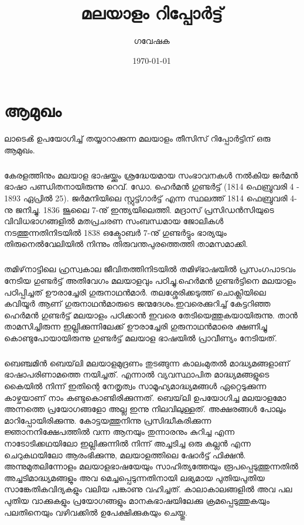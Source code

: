 \documentclass[12pt]{report}
\title{മലയാളം റിപ്പോർട്ട്}
\author{ഗവേഷക}
\date{\today}
\begin{document}



\newpage




%

\tableofcontents


\chapter{ആമുഖം}

ലാടെൿ ഉപയോഗിച്ച് തയ്യാറാക്കുന്ന മലയാളം തീസിസ് റിപ്പോർട്ടിന് ഒരു ആമുഖം.

\paragraph{}
 കേരളത്തിനും മലയാള ഭാഷയ്ക്കും ശ്രദ്ധേയമായ സംഭാവനകൾ നൽകിയ ജർമൻ ഭാഷാ പണ്ഡിതനായിരുന്നു റെവ്. ഡോ. ഹെർമൻ ഗുണ്ടർട്ട് (1814 ഫെബ്രുവരി 4 - 1893 ഏപ്രിൽ 25). ജർമനിയിലെ സ്റ്റുട്ട്ഗാർട്ട് എന്ന സ്ഥലത്ത് 1814 ഫെബ്രുവരി 4-നു ജനിച്ചു. 1836 ജൂലൈ 7-നു് ഇന്ത്യയിലെത്തി. മദ്രാസ് പ്രസിഡൻസിയുടെ വിവിധഭാഗങ്ങളിൽ മതപ്രചരണ സംബന്ധമായ ജോലികൾ നടത്തുന്നതിനിടയിൽ 1838 ഒക്ടോബർ 7-നു് ഗുണ്ടർട്ടും ഭാര്യയും തിരുനെൽവേലിയിൽ നിന്നും തിരുവന്തപുരത്തെത്തി താമസമാക്കി.

\paragraph{}
തമിഴ്‌നാട്ടിലെ ഹ്രസ്വകാല ജീവിതത്തിനിടയിൽ തമിഴ്ഭാഷയിൽ പ്രസംഗപാടവം നേടിയ ഗുണ്ടർട്ട് അതിവേഗം മലയാളവും പഠിച്ചു.ഹെർമൻ ഗുണ്ടർട്ടിനെ മലയാളം പഠിപ്പിച്ചത് ഊരാച്ചേരി ഗുരുനാഥൻമാർ. തലശ്ശേരിക്കടുത്ത് ചൊക്ലിയിലെ കവിയൂർ ആണ് ഗുരുനാഥൻമാരുടെ ജന്മദേശം.ഇവരെക്കുറിച്ച് കേട്ടറിഞ്ഞ ഹെർമൻ ഗുണ്ടർട്ട് മലയാളം പഠിക്കാൻ ഇവരെ തേടിയെത്തുകയായിരുന്നു. താൻ താമസിച്ചിരുന്ന ഇല്ലിക്കുന്നിലേക്ക് ഊരാച്ചേരി ഗുരുനാഥൻമാരെ ക്ഷണിച്ചു കൊണ്ടുപോയായിരുന്നു ഗുണ്ടർട്ട് മലയാള ഭാഷയിൽ പ്രാവീണ്യം നേടിയത്. 

\paragraph{}
ബെഞ്ചമിൻ ബെയ്‌ലി മലയാളമുദ്രണം തുടങ്ങുന്ന കാലംമുതൽ മാദ്ധ്യമങ്ങളാണ് ഭാഷാപരിണാമത്തെ നയിച്ചത്. എന്നാൽ വ്യവസ്ഥാപിത മാദ്ധ്യമങ്ങളുടെ കൈയിൽ നിന്ന് ഇതിന്റെ നേതൃത്വം സാമൂഹ്യമാദ്ധ്യമങ്ങൾ ഏറ്റെടുക്കുന്ന കാഴ്ചയാണ് നാം കണ്ടുകൊണ്ടിരിക്കുന്നത്. ബെയ്‌ലി ഉപയോഗിച്ച മലയാളമോ അന്നത്തെ പ്രയോഗങ്ങളോ അല്ല ഇന്നു നിലവിലുള്ളത്. അക്ഷരങ്ങൾ പോലും മാറിപ്പോയിരിക്കുന്നു. കോട്ടയത്തുനിന്നു പ്രസിദ്ധീകരിക്കുന്ന ജ്ഞാനനിക്ഷേപത്തിൽ വന്ന ആനയും തുന്നാരനും കുറിച്ച എന്ന നാടോടിക്കഥയിലോ ഇല്ലിക്കുന്നിൽ നിന്ന് അച്ചടിച്ച ഒരു കല്ലൻ എന്ന ചെറുകഥയിലോ ആരംഭിക്കുന്നു, മലയാളത്തിലെ ഷോർട്ട് ഫിക്ഷൻ. അന്നുമുതലിന്നോളം മലയാളഭാഷയേയും സാഹിത്യത്തേയും രൂപപ്പെടുത്തുന്നതിൽ അച്ചടിമാദ്ധ്യമങ്ങളും അവ മെച്ചപ്പെടുന്നതിനായി ലഭ്യമായ പുതിയപുതിയ സാങ്കേതികവിദ്യകളും വലിയ പങ്കാണു വഹിച്ചത്. കാലാകാലങ്ങളിൽ അവ പല പുതിയ വാക്കുകളും പ്രയോഗങ്ങളും മാനകഭാഷയിലേക്കു ക്രമപ്പെടുത്തുകയും പലതിനെയും വഴിവക്കിൽ ഉപേക്ഷിക്കുകയും ചെയ്തു. 
\end{document}
